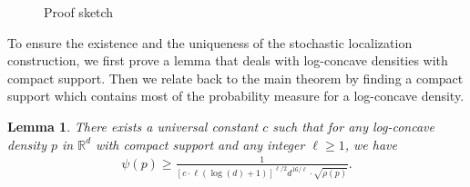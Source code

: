\documentclass[11pt,twoside]{article}
\newcommand{\spec}[1]{\rho\parenth{#1}}
\newcommand{\isoperi}{\psi}
\theoremstyle{named}
\theoremstyle{plain}
\newtheorem{lemma}{Lemma}
\newcommand{\usedim}{\ensuremath{d}}
\newcommand{\dims}{\usedim}
\newcommand{\real}{\ensuremath{\mathbb{R}}}
\newcommand{\brackets}[1]{\left[ #1 \right]}
\newcommand{\parenth}[1]{\left( #1 \right)}
\begin{document}
\begin{figure}[ht]
  \caption{Proof sketch}
  \label{fig:proof_sketch}
\end{figure}



To ensure the existence and the uniqueness of the stochastic localization construction, we first prove a lemma that deals with log-concave densities with compact support. Then we relate back to the main theorem by finding a compact support which contains most of the probability measure for a log-concave density.

\begin{lemma}
  \label{lem:main_lemma_KLS}
  There exists a universal constant $c$ such that for any log-concave density $p$ in $\real^\dims$ with compact support and any integer $\ell \geq 1$, we have
  \begin{align}
    \label{eq:main_lemma_KLS}
    \isoperi(p) \geq \frac{1}{\brackets{c \cdot \ell \parenth{\log(\dims)+1}}^{\ell/2} \dims^{16/\ell} \cdot \sqrt{\spec{p}}}.
  \end{align}
\end{lemma}
\end{document}
